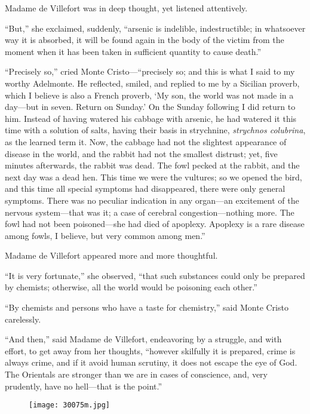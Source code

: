 Madame de Villefort was in deep thought, yet listened attentively.

“But,” she exclaimed, suddenly, “arsenic is indelible, indestructible;
in whatsoever way it is absorbed, it will be found again in the body of
the victim from the moment when it has been taken in sufficient
quantity to cause death.”

“Precisely so,” cried Monte Cristo—“precisely so; and this is what I
said to my worthy Adelmonte. He reflected, smiled, and replied to me by
a Sicilian proverb, which I believe is also a French proverb, ‘My son,
the world was not made in a day—but in seven. Return on Sunday.’ On the
Sunday following I did return to him. Instead of having watered his
cabbage with arsenic, he had watered it this time with a solution of
salts, having their basis in strychnine, \textit{strychnos colubrina}, as the
learned term it. Now, the cabbage had not the slightest appearance of
disease in the world, and the rabbit had not the smallest distrust;
yet, five minutes afterwards, the rabbit was dead. The fowl pecked at
the rabbit, and the next day was a dead hen. This time we were the
vultures; so we opened the bird, and this time all special symptoms had
disappeared, there were only general symptoms. There was no peculiar
indication in any organ—an excitement of the nervous system—that was
it; a case of cerebral congestion—nothing more. The fowl had not been
poisoned—she had died of apoplexy. Apoplexy is a rare disease among
fowls, I believe, but very common among men.”

Madame de Villefort appeared more and more thoughtful.

“It is very fortunate,” she observed, “that such substances could only
be prepared by chemists; otherwise, all the world would be poisoning
each other.”

“By chemists and persons who have a taste for chemistry,” said Monte
Cristo carelessly.

“And then,” said Madame de Villefort, endeavoring by a struggle, and
with effort, to get away from her thoughts, “however skilfully it is
prepared, crime is always crime, and if it avoid human scrutiny, it
does not escape the eye of God. The Orientals are stronger than we are
in cases of conscience, and, very prudently, have no hell—that is the
point.”

\begin{figure}[ht]
\texttt{[image: 30075m.jpg]}
\end{figure}

